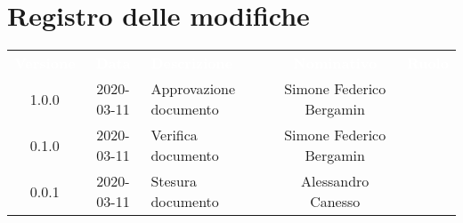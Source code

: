 \section*{Registro delle modifiche}
{
	\centering
	\begin{longtable}{ c c  C{4cm}  c  c }
		\textcolor{white}{\textbf{Versione}} & \textcolor{white}{\textbf{Data}} & \textcolor{white}{\textbf{Descrizione}} & \textcolor{white}{\textbf{Nominativo}} & \textcolor{white}{\textbf{Ruolo}}\\		
		1.0.0 & 2020-03-11 & Approvazione documento & Simone Federico Bergamin &\RdP{}\\		
		0.1.0 & 2020-03-11 & Verifica documento & Simone Federico Bergamin &\ver{}\\		
		0.0.1 & 2020-03-11 & Stesura documento & Alessandro Canesso &\reda{}\\		
		
	\end{longtable}

}